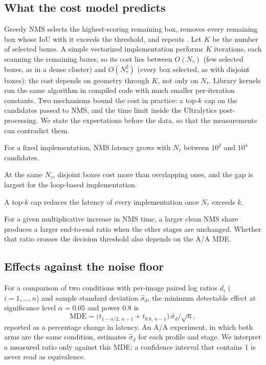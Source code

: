\documentclass[a4paper,fleqn]{cas-dc}
\newcommand{\Ntau}{N_{\tau}}
\begin{document}
\subsection{What the cost model predicts}
Greedy NMS selects the highest-scoring remaining box, removes every remaining box whose IoU with it exceeds the threshold, and repeats \cite{neubeck2006nms}. Let $K$ be the number of selected boxes. A simple vectorized implementation performs $K$ iterations, each scanning the remaining boxes, so its cost lies between $O(\Ntau)$ (few selected boxes, as in a dense cluster) and $O(\Ntau^2)$ (every box selected, as with disjoint boxes): the cost depends on geometry through $K$, not only on $\Ntau$. Library kernels run the same algorithm in compiled code with much smaller per-iteration constants. Two mechanisms bound the cost in practice: a top-$k$ cap on the candidates passed to NMS, and the time limit inside the Ultralytics post-processing. We state the expectations before the data, so that the measurements can contradict them.
\begin{description}[leftmargin=2.5em,labelwidth=2.2em,itemsep=2pt]
\item[H1] For a fixed implementation, NMS latency grows with $\Ntau$ between $10^2$ and $10^4$ candidates.
\item[H2] At the same $\Ntau$, disjoint boxes cost more than overlapping ones, and the gap is largest for the loop-based implementation.
\item[H3] A top-$k$ cap reduces the latency of every implementation once $\Ntau$ exceeds $k$.
\item[H4] For a given multiplicative increase in NMS time, a larger clean NMS share produces a larger end-to-end ratio when the other stages are unchanged. Whether that ratio crosses the decision threshold also depends on the A/A MDE.
\end{description}

\subsection{Effects against the noise floor}
For a comparison of two conditions with per-image paired log ratios $d_i$ ($i=1,\dots,n$) and sample standard deviation $\hat\sigma_d$, the minimum detectable effect at significance level $\alpha=0.05$ and power $0.8$ is
\begin{equation}
\mathrm{MDE}=\bigl(t_{1-\alpha/2,\,n-1}+t_{0.8,\,n-1}\bigr)\,\hat\sigma_d/\sqrt{n},
\end{equation}
reported as a percentage change in latency. An A/A experiment, in which both arms are the same condition, estimates $\hat\sigma_d$ for each profile and stage. We interpret a measured ratio only against this MDE; a confidence interval that contains 1 is never read as equivalence.
\end{document}
